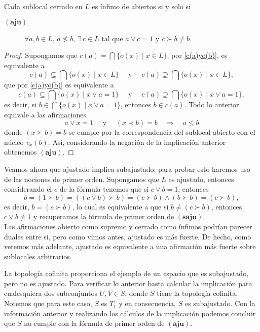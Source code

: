 \documentclass{comunicaciones}
\begin{document}
\begin{thm}\label{Teorema 4.4.1}
    Cada sublocal cerrado en $L$ es ínfimo de abiertos si y solo si 
    \begin{description}
        \item[$(\mathbf{aju})$] $\forall a, b\in L,\, a\nleq b,\, \exists\, c\in L\mbox{ tal que }a\vee c=1 \mbox{ y }c\succ b\neq b$.
    \end{description}
\end{thm}

\begin{proof}
    Supongamos que $c(a)=\bigcap\{o(x)\mid x\in L\}$, por \ref{c(a)yo(b)}, es equivalente a 
    \[
    c(a)\subseteq\bigcap\{o(x)\mid x\in L\}\quad \mbox{ y }\quad c(a)\supseteq\bigcap\{o(x)\mid x\in L\},
    \] 
    que por \ref{c(a)yo(b)} es equivalente a
    \[
    c(a)\subseteq\bigcap\{o(x)\mid x\vee a=1\}\quad \mbox{ y }\quad c(a)\supseteq\bigcap\{o(x)\mid x\vee a=1\},
    \]
    es decir, si $b\in \bigcap\{o(x)\mid x\vee a=1\}$, entonces $b\in c(a)$. Todo lo anterior equivale a las afirmaciones
    \[
    a\vee x=1\quad \mbox{ y }\quad(x\prec b)=b\quad \Rightarrow \quad a\leq b
    \]
    donde $(x\succ b)=b$ se cumple por la correspondencia del sublocal abierto con el núcleo $v_x(b)$. Así, considerando la negación de la implicación anterior obtenemos $(\mathbf{aju})$.
\end{proof}

Veamos ahora que ajustado implica subajustado, para probar esto haremos uso de las nociones de primer orden. Supongamos que $L$ es ajustado, entonces considerando el $c$ de la fórmula tenemos que si $c\vee b=1$, entonces 
\[
b=(1\succ b)=((c\vee b)\succ b)=(c\succ b)\wedge(b\succ b)=(c\succ b),
\]
es decir, $b=(c\succ b)$, lo cual es equivalente a que si $b\neq (c\succ b)$, entonces $c\vee b\neq 1$ y recuperamos la fórmula de primer orden de $(\mathbf{saju})$.\\

Las afirmaciones abierto como supremo y cerrado como ínfimos podrían parecer duales entre si, pero como vimos antes, ajustado es más fuerte. De hecho, como veremos más adelante, ajustado es equivalente a una afirmación más fuerte sobre sublocales arbitrarios.

\begin{ej}\label{Saju no aju}
La topología cofinita proporciona el ejemplo de un espacio que es subajustado, pero no es ajustado. Para verificar lo anterior basta calcular la implicación para cualesquiera dos subconjuntos $U, V\in S$, donde $S$ tiene la topología cofinita. Notemos que para este caso, $S$ es $T_1$ y en consecuencia, $S$ es subajustado. Con la información anterior y realizando los cálculos de la implicación podemos concluir que $S$ no cumple con la fórmula de primer orden de $(\mathbf{aju})$.
\end{ej}
\end{document}
